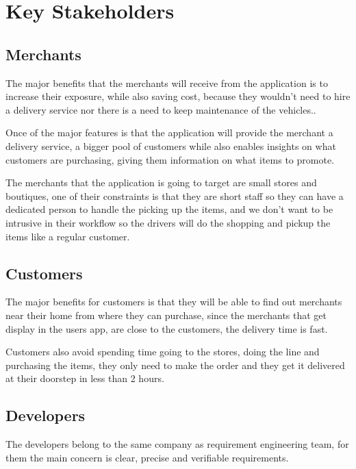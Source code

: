 \section{Key Stakeholders}

\subsection{Merchants}
The major benefits that the merchants will receive from the application is to 
increase their exposure, while also saving cost, because they wouldn't need to 
hire a delivery service nor there is a need to keep maintenance 
of the vehicles..\newline

\noindent Once of the major features is that the application will provide the 
merchant a delivery service, a bigger pool of customers while also enables 
insights on what customers are purchasing, giving them information on what 
items to promote.\newline

\noindent The merchants that the application is going to target are small 
stores and boutiques, one of their constraints is that they are short staff so 
they can have a dedicated person to handle the picking up the items, and we 
don’t want to be intrusive in their workflow so the drivers will do the 
shopping and pickup the items like a regular customer.

\subsection{Customers}
The major benefits for customers is that they will be able to find out 
merchants near their home from where they can purchase, since the merchants 
that get display in the users app, are close to the customers, the delivery 
time is fast.\newline

\noindent Customers also avoid spending time going to the stores, doing the 
line and purchasing the items, they only need to make the order and they get 
it delivered at their doorstep in less than 2 hours.

\subsection{Developers}
The developers belong to the same company as requirement engineering team, for 
them the main concern is clear, precise and verifiable requirements.

